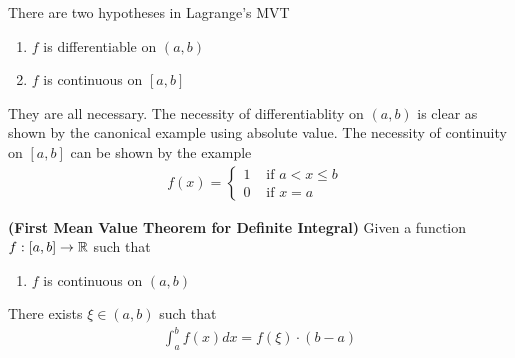 \documentclass{report}
\begin{document}
\begin{mdframed}
There are two hypotheses in Lagrange's MVT 
\begin{enumerate}[label=(\alph*)]
  \item $f$ is differentiable on $(a,b)$ 
  \item $f$ is continuous on $[a,b]$
\end{enumerate}
They are all necessary. The necessity of differentiablity on $(a,b)$ is clear as shown by the canonical example using absolute value. The necessity of continuity on $[a,b]$ can be shown by the example 
\begin{align*}
f(x)=\begin{cases}
  1& \text{ if $a<x\leq b$ }\\
  0& \text{ if  }x=a
\end{cases}
\end{align*}
\end{mdframed}
\begin{theorem}
\textbf{(First Mean Value Theorem for Definite Integral)} Given a function $f:[a,b]\rightarrow \mathbb{R}$ such that 
\begin{enumerate}[label=(\alph*)]
  \item $f$ is continuous on $(a,b)$
\end{enumerate}
There exists $\xi \in (a,b)$ such that 
\begin{align*}
\int_a^b f(x)dx = f(\xi)\cdot (b-a)
\end{align*}
\end{theorem}
\end{document}
